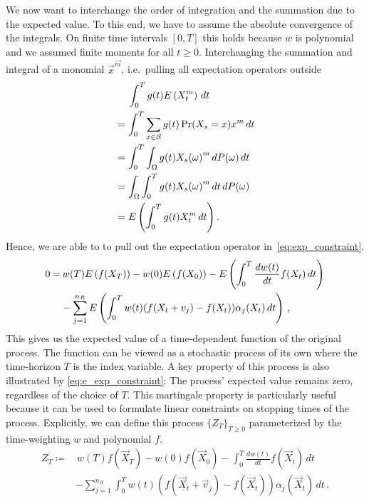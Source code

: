 We now want to interchange the order of integration and the summation due to the expected value.
To this end, we have to assume the absolute convergence of the integrals.
On finite time intervals $[0,T]$ this holds because $w$
is polynomial and we assumed finite moments for all $t\geq 0$.
Interchanging the  summation  and integral of a monomial
${\vec{x}}^{\vec{m}}$, i.e.\ pulling all expectation operators outside
\begin{align*}
	& \;\quad\int_{0}^Tg(t){E}\left(X_t^{m}\right)\,dt\\
	& =\int_{0}^T\sum_{x\in\mathcal{S}}g(t)\Pr(X_s=x)x^m\,dt\\
	& =\int_{0}^T\int_{\Omega} g(t) {X_s(\omega)}^m\,dP(\omega)\,dt\\
	& =\int_{\Omega}\int_{0}^T g(t) {X_s(\omega)}^m\,dt\,dP(\omega)\\
	& ={E}\left(\int_{0}^Tg(t){X}_t^{m}\,dt\right).
\end{align*}
Hence, we are able to to pull out the expectation operator in~\eqref{eq:exp_constraint}.
\begin{equation}\label{eq:e_exp_constraint}
\begin{split}
    0=&\,w(T){E}\left(f(X_T)\right) - w(0){E}\left(f(X_{0})\right) -
    {E}\left(\int_{0}^T\frac{dw(t)}{dt}f(X_t)\,dt\right)\\
    &-\sum_{j=1}^{n_R}{E}\left(\int_{0}^Tw(t)
         (f(X_t+v_j) - f(X_t))\alpha_j(X_t)\,dt\right)\,,
         \end{split}
\end{equation}
This gives us the expected value of a time-dependent function of the original process.
The function can be viewed as a stochastic process of its own where the
time-horizon $T$ is the index variable. A key property
of this process is also illustrated by \eqref{eq:e_exp_constraint}: The process'
expected value remains zero, regardless of the choice of $T$.
This martingale property is particularly useful because it can be used
to formulate linear constraints on stopping times of the process.
Explicitly, we can define this process $\{Z_T\}_{T\geq 0}$ parameterized by
the time-weighting $w$ and polynomial $f$.
\begin{equation}\label{eq:martingale}
\begin{split}
    Z_T\coloneqq&\,w(T)f(\vec X_T) - w(0)f(\vec X_{0}) -
    \int_{0}^T\frac{dw(t)}{dt}f(\vec X_t)\,dt\\
    &-\sum_{j=1}^{n_R}\int_{0}^Tw(t)
         (f(\vec X_t+\vec v_j) - f(\vec X_t))\alpha_j(\vec X_t)\,dt\,.
         \end{split}
\end{equation}
